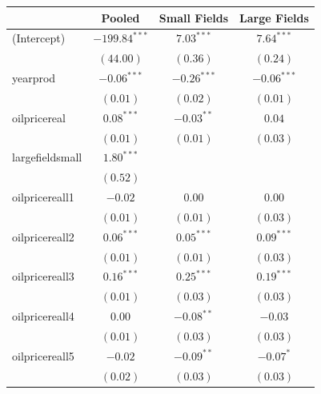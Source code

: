 \documentclass[11pt]{article}
\begin{document}
\begin{spacing}{1}
\begin{table}
\begin{center}
\begin{tabular}{l c c c }
\hline
                                     & Pooled & Small Fields & Large Fields \\
\hline
(Intercept)                          & $-199.84^{***}$ & $7.03^{***}$   & $7.64^{***}$    \\
                                     & $(44.00)$       & $(0.36)$       & $(0.24)$        \\
yearprod                            & $-0.06^{***}$   & $-0.26^{***}$  & $-0.06^{***}$   \\
                                     & $(0.01)$        & $(0.02)$       & $(0.01)$        \\
oilpricereal                       & $0.08^{***}$    & $-0.03^{**}$   & $0.04$          \\
                                     & $(0.01)$        & $(0.01)$       & $(0.03)$        \\
largefieldsmall                     & $1.80^{***}$    &                &                 \\
                                     & $(0.52)$        &                &                 \\
oilpricereall1                    & $-0.02$         & $0.00$         & $0.00$          \\
                                     & $(0.01)$        & $(0.01)$       & $(0.03)$        \\
oilpricereall2                    & $0.06^{***}$    & $0.05^{***}$   & $0.09^{***}$    \\
                                     & $(0.01)$        & $(0.01)$       & $(0.03)$        \\
oilpricereall3                    & $0.16^{***}$    & $0.25^{***}$   & $0.19^{***}$    \\
                                     & $(0.01)$        & $(0.03)$       & $(0.03)$        \\
oilpricereall4                    & $0.00$          & $-0.08^{**}$   & $-0.03$         \\
                                     & $(0.01)$        & $(0.03)$       & $(0.03)$        \\
oilpricereall5                    & $-0.02$         & $-0.09^{**}$   & $-0.07^{*}$     \\
                                     & $(0.02)$        & $(0.03)$       & $(0.03)$        \\

\end{tabular}
\end{center}
\end{table}
\end{spacing}
\end{document}

